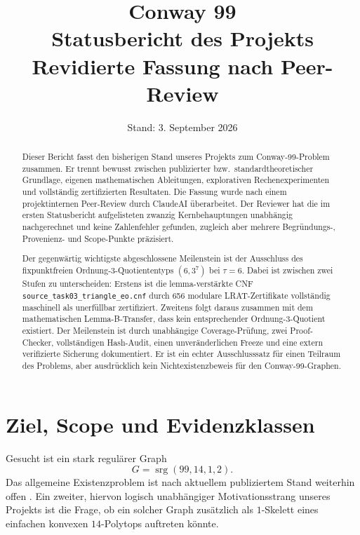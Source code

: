 \documentclass[11pt,a4paper]{article}
\title{\textbf{Conway 99}\\Statusbericht des Projekts\\[2mm]
\large Revidierte Fassung nach Peer-Review}
\author{}
\date{Stand: 3. September 2026}
\newcommand{\srg}{\operatorname{srg}}
\newcommand{\code}[1]{\texttt{#1}}
\begin{document}
\maketitle

\begin{abstract}
Dieser Bericht fasst den bisherigen Stand unseres Projekts zum Conway-99-Problem zusammen. Er trennt bewusst zwischen publizierter bzw.\ standardtheoretischer Grundlage, eigenen mathematischen Ableitungen, explorativen Rechenexperimenten und vollständig zertifizierten Resultaten. Die Fassung wurde nach einem projektinternen Peer-Review durch ClaudeAI überarbeitet. Der Reviewer hat die im ersten Statusbericht aufgelisteten zwanzig Kernbehauptungen unabhängig nachgerechnet und keine Zahlenfehler gefunden, zugleich aber mehrere Begründungs-, Provenienz- und Scope-Punkte präzisiert.

Der gegenwärtig wichtigste abgeschlossene Meilenstein ist der Ausschluss des fixpunktfreien Ordnung-$3$-Quotiententyps $(6,3^7)$ bei $\tau=6$. Dabei ist zwischen zwei Stufen zu unterscheiden: Erstens ist die lemma-verstärkte CNF \code{source\_task03\_triangle\_eo.cnf} durch 656 modulare LRAT-Zertifikate vollständig maschinell als unerfüllbar zertifiziert. Zweitens folgt daraus zusammen mit dem mathematischen Lemma-B-Transfer, dass kein entsprechender Ordnung-$3$-Quotient existiert. Der Meilenstein ist durch unabhängige Coverage-Prüfung, zwei Proof-Checker, vollständigen Hash-Audit, einen unveränderlichen Freeze und eine extern verifizierte Sicherung dokumentiert. Er ist ein echter Ausschlusssatz für einen Teilraum des Problems, aber ausdrücklich kein Nichtexistenzbeweis für den Conway-99-Graphen.
\end{abstract}

\section{Ziel, Scope und Evidenzklassen}

Gesucht ist ein stark regulärer Graph
\[
G=\srg(99,14,1,2).
\]
Das allgemeine Existenzproblem ist nach aktuellem publiziertem Stand weiterhin offen \cite{CesarzWoldar2025}. Ein zweiter, hiervon logisch unabhängiger Motivationsstrang unseres Projekts ist die Frage, ob ein solcher Graph zusätzlich als $1$-Skelett eines einfachen konvexen $14$-Polytops auftreten könnte.
\end{document}
